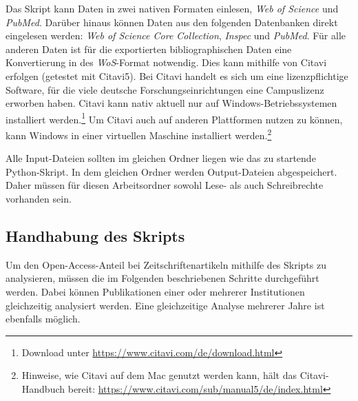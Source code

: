 Das Skript kann Daten in zwei nativen Formaten einlesen, \textit{Web of Science} und \textit{PubMed}. Darüber hinaus können Daten aus den folgenden Datenbanken direkt eingelesen werden: \textit{Web of Science Core Collection}, \textit{Inspec} und \textit{PubMed}. Für alle anderen Daten ist für die exportierten bibliographischen Daten eine Konvertierung in des \textit{WoS}-Format notwendig. Dies kann mithilfe von Citavi erfolgen (getestet mit Citavi5). 
Bei Citavi handelt es sich um eine lizenzpflichtige Software, für die viele deutsche Forschungseinrichtungen eine Campuslizenz erworben haben.
Citavi kann nativ aktuell nur auf Windows-Betriebssystemen installiert werden.\footnote{Download unter \url{https://www.citavi.com/de/download.html}} Um Citavi auch auf anderen Plattformen nutzen zu können, kann Windows in einer virtuellen Maschine installiert werden.\footnote{Hinweise, wie Citavi auf dem Mac genutzt werden kann, hält das Citavi-Handbuch bereit:\newline
\url{https://www.citavi.com/sub/manual5/de/index.html}}

Alle Input-Dateien sollten im gleichen Ordner liegen wie das zu startende Python-Skript. In dem gleichen Ordner werden Output-Dateien abgespeichert. Daher müssen für diesen Arbeitsordner sowohl Lese- als auch Schreibrechte vorhanden sein.

\subsection{Handhabung des Skripts}
\label{ownanalysis}
Um den Open-Access-Anteil bei Zeitschriftenartikeln mithilfe des Skripts zu analysieren, müssen die im Folgenden beschriebenen Schritte durchgeführt werden. Dabei können Publikationen einer oder mehrerer Institutionen gleichzeitig analysiert werden. Eine gleichzeitige Analyse mehrerer Jahre ist ebenfalls möglich.

